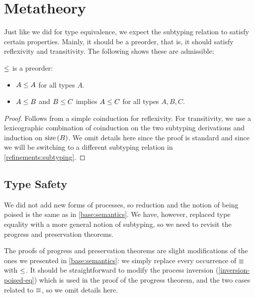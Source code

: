 
\section{Metatheory}

Just like we did for type equivalence, we expect the subtyping relation to satisfy certain properties. Mainly, it should be a preorder, that is, it should satisfy reflexivity and transitivity. The following  shows these are admissible:

\begin{theorem}
  \label{base:sub-is-preorder}
  $\le$ is a preorder:
  \begin{itemize}
    \item $A \le A$ for all types $A$.
    \item $A \le B$ and $B \le C$ implies $A \le C$ for all types $A, B, C$.
  \end{itemize}
\end{theorem}
\begin{proof}
  Follows from a simple coinduction for reflexivity. For transitivity, we use a lexicographic combination of coinduction on the two subtyping derivations and induction on $\operatorname{size}{(B)}$. We omit details here since the proof is standard and since we will be switching to a different subtyping relation in \cref{refinements:subtyping}.
\end{proof}


\subsection{Type Safety}

We did not add new forms of processes, so reduction and the notion of being poised is the same as in \cref{base:semantics}. We have, however, replaced type equality with a more general notion of subtyping, so we need to revisit the progress and preservation theorems.

The proofs of progress and preservation theorems are slight modifications of the ones we presented in \cref{base:semantics}: we simply replace every occurrence of $\equiv$ with $\le$. It should be straightforward to modify the process inversion  (\cref{inversion-poised-eq}) which is used in the proof of the progress theorem, and the two cases related to $\equiv$, so we omit details here.

